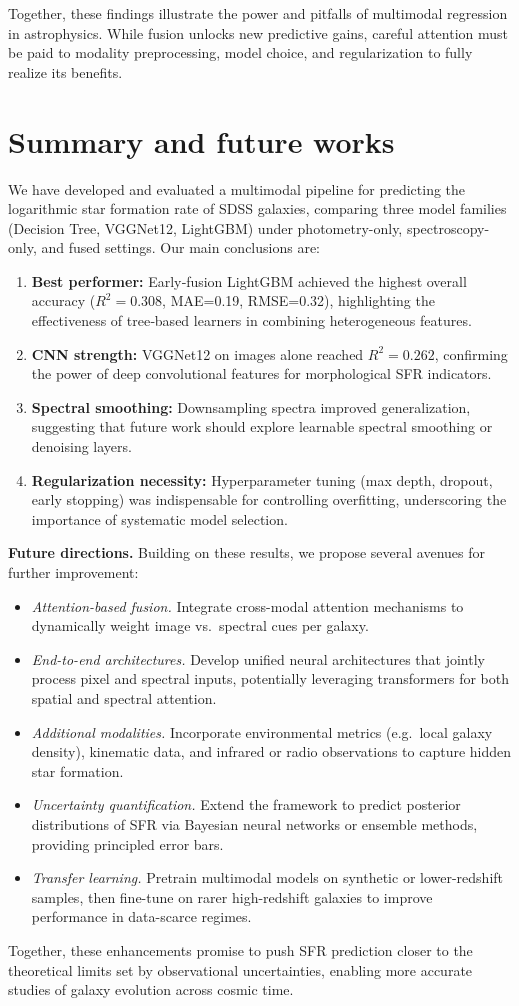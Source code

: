 \documentclass[english,bachelor,oneside]{ctufit-thesis}
\begin{document}
Together, these findings illustrate the power and pitfalls of multimodal regression in astrophysics. While fusion unlocks new predictive gains, careful attention must be paid to modality preprocessing, model choice, and regularization to fully realize its benefits.

\section{Summary and future works}
\label{ch:future}

We have developed and evaluated a multimodal pipeline for predicting the logarithmic star formation rate of SDSS galaxies, comparing three model families (Decision Tree, VGGNet12, LightGBM) under photometry-only, spectroscopy-only, and fused settings. Our main conclusions are:

\begin{enumerate}
  \item \textbf{Best performer:} Early‐fusion LightGBM achieved the highest overall accuracy ($R^2=0.308$, MAE=0.19, RMSE=0.32), highlighting the effectiveness of tree‐based learners in combining heterogeneous features.
  \item \textbf{CNN strength:} VGGNet12 on images alone reached $R^2=0.262$, confirming the power of deep convolutional features for morphological SFR indicators.
  \item \textbf{Spectral smoothing:} Downsampling spectra improved generalization, suggesting that future work should explore learnable spectral smoothing or denoising layers.
  \item \textbf{Regularization necessity:} Hyperparameter tuning (max depth, dropout, early stopping) was indispensable for controlling overfitting, underscoring the importance of systematic model selection.
\end{enumerate}

\noindent\textbf{Future directions.} Building on these results, we propose several avenues for further improvement:

\begin{itemize}
  \item \emph{Attention-based fusion.} Integrate cross-modal attention mechanisms to dynamically weight image vs.\ spectral cues per galaxy.
  \item \emph{End-to-end architectures.} Develop unified neural architectures that jointly process pixel and spectral inputs, potentially leveraging transformers for both spatial and spectral attention.
  \item \emph{Additional modalities.} Incorporate environmental metrics (e.g.\ local galaxy density), kinematic data, and infrared or radio observations to capture hidden star formation.
  \item \emph{Uncertainty quantification.} Extend the framework to predict posterior distributions of SFR via Bayesian neural networks or ensemble methods, providing principled error bars.
  \item \emph{Transfer learning.} Pretrain multimodal models on synthetic or lower-redshift samples, then fine-tune on rarer high-redshift galaxies to improve performance in data-scarce regimes.
\end{itemize}

Together, these enhancements promise to push SFR prediction closer to the theoretical limits set by observational uncertainties, enabling more accurate studies of galaxy evolution across cosmic time.
\backmatter

\printbibliography
\end{document}
